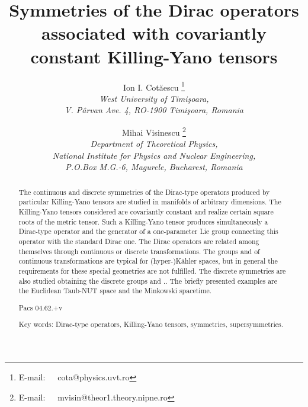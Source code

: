 \documentclass[a4paper,12pt]{article}
\begin{document}


\providecommand{\Lor}{L^{\uparrow}_{+}}
\newtheorem{lem}{Lemma}
\newtheorem{defin}{Definition}
\newtheorem{theor}{Theorem}
\newtheorem{prop}{Proposition}
\newtheorem{cor}{Corollary}
\newenvironment{demo}
{\bgroup\par\smallskip\noindent{\it Proof: }}{\rule{0.5em}{0.5em}
\egroup}



\def\Eh{\mbox{\teneufm\char 83}}


\title{Symmetries of the Dirac operators associated with covariantly 
constant Killing-Yano tensors}

\author{Ion I. Cot\u aescu \thanks{E-mail:~~~cota@physics.uvt.ro}\\ 
{\small \it West University of Timi\c soara,}\\
       {\small \it V. P\^ arvan Ave. 4, RO-1900 Timi\c soara, Romania}
\and
Mihai Visinescu \thanks{E-mail:~~~mvisin@theor1.theory.nipne.ro}\\
{\small \it Department of Theoretical Physics,}\\
{\small \it National Institute for Physics and Nuclear Engineering,}\\
{\small \it P.O.Box M.G.-6, Magurele, Bucharest, Romania}}
\date{}

\maketitle

\begin{abstract}
The continuous and discrete symmetries of the Dirac-type operators produced 
by particular Killing-Yano tensors are studied in manifolds of arbitrary 
dimensions. The Killing-Yano tensors considered are covariantly 
constant and realize  certain square roots of the metric tensor. Such a 
Killing-Yano tensor produces simultaneously a Dirac-type operator and the 
generator of a one-parameter Lie group connecting this operator with the 
standard Dirac one. The Dirac operators are related among themselves through 
continuous or discrete transformations. The groups \coordHE{} and \coordHE{}  of 
continuous transformations are typical for (hyper-)K\"ahler spaces, but in 
general the requirements for these special geometries are not fulfilled. 
The discrete symmetries are also studied obtaining the discrete groups  
\coordHE{} and \coordHE{}.. The briefly presented examples are the 
Euclidean Taub-NUT space and the Minkowski spacetime.

Pacs 04.62.+v

Key words: Dirac-type operators, Killing-Yano tensors, 
symmetries, supersymmetries.
\end{abstract}
\end{document}
